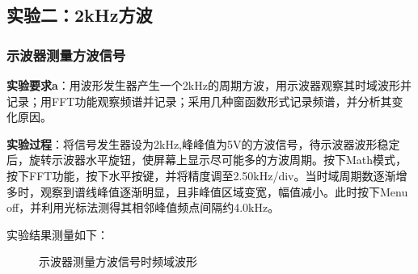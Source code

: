 \documentclass[12pt]{article}
\begin{document}
\subsection{实验二：2kHz方波}
\subsubsection{示波器测量方波信号}
\textbf{实验要求a}：用波形发生器产生一个2kHz的周期方波，用示波器观察其时域波形并记录；用FFT功能观察频谱并记录；采用几种窗函数形式记录频谱，并分析其变化原因。

\textbf{实验过程}：将信号发生器设为2kHz,峰峰值为5V的方波信号，待示波器波形稳定后，旋转示波器水平旋钮，使屏幕上显示尽可能多的方波周期。按下Math模式，按下FFT功能，按下水平按键，并将精度调至2.50kHz/div。当时域周期数逐渐增多时，观察到谱线峰值逐渐明显，且非峰值区域变宽，幅值减小。此时按下Menu off，并利用光标法测得其相邻峰值频点间隔约4.0kHz。

实验结果测量如下：
\begin{figure}[H]
    \centering
    
     \hspace{0.005\linewidth}
       
    \hspace{0.005\linewidth}
    \caption{示波器测量方波信号时频域波形}
  \label{示波器2a(2)}
\end{figure}
\end{document}
